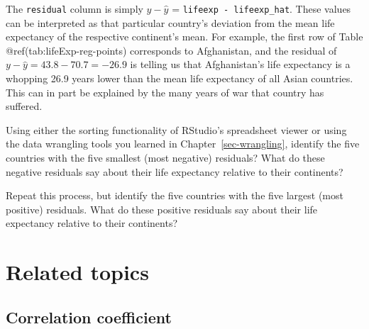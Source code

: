 \documentclass[
  letterpaper,
  DIV=11,
  numbers=noendperiod]{scrreprt}
\theoremstyle{definition}
\theoremstyle{remark}
\begin{document}
The \texttt{residual} column is simply \(y - \widehat{y}\) =
\texttt{lifeexp\ -\ lifeexp\_hat}. These values can be interpreted as
that particular country's deviation from the mean life expectancy of the
respective continent's mean. For example, the first row of Table
@ref(tab:lifeExp-reg-points) corresponds to Afghanistan, and the
residual of \(y - \widehat{y} = 43.8 - 70.7 = -26.9\) is telling us that
Afghanistan's life expectancy is a whopping 26.9 years lower than the
mean life expectancy of all Asian countries. This can in part be
explained by the many years of war that country has suffered.

\begin{tcolorbox}[enhanced jigsaw, coltitle=black, toprule=.15mm, bottomtitle=1mm, breakable, leftrule=.75mm, title={{🎯} Learning Check 5.5}, opacitybacktitle=0.6, colback=white, rightrule=.15mm, opacityback=0, toptitle=1mm, colbacktitle=quarto-callout-tip-color!10!white, colframe=quarto-callout-tip-color-frame, titlerule=0mm, arc=.35mm, bottomrule=.15mm, left=2mm]
Using either the sorting functionality of RStudio's spreadsheet viewer
or using the data wrangling tools you learned in
Chapter~\ref{sec-wrangling}, identify the five countries with the five
smallest (most negative) residuals? What do these negative residuals say
about their life expectancy relative to their continents?
\end{tcolorbox}

\begin{tcolorbox}[enhanced jigsaw, coltitle=black, toprule=.15mm, bottomtitle=1mm, breakable, leftrule=.75mm, title={{🎯} Learning Check 5.6}, opacitybacktitle=0.6, colback=white, rightrule=.15mm, opacityback=0, toptitle=1mm, colbacktitle=quarto-callout-tip-color!10!white, colframe=quarto-callout-tip-color-frame, titlerule=0mm, arc=.35mm, bottomrule=.15mm, left=2mm]
Repeat this process, but identify the five countries with the five
largest (most positive) residuals. What do these positive residuals say
about their life expectancy relative to their continents?
\end{tcolorbox}

\hypertarget{related-topics}{%
\section{Related topics}\label{related-topics}}

\hypertarget{sec-correlationcoefficient}{%
\subsection{Correlation coefficient}\label{sec-correlationcoefficient}}
\end{document}
